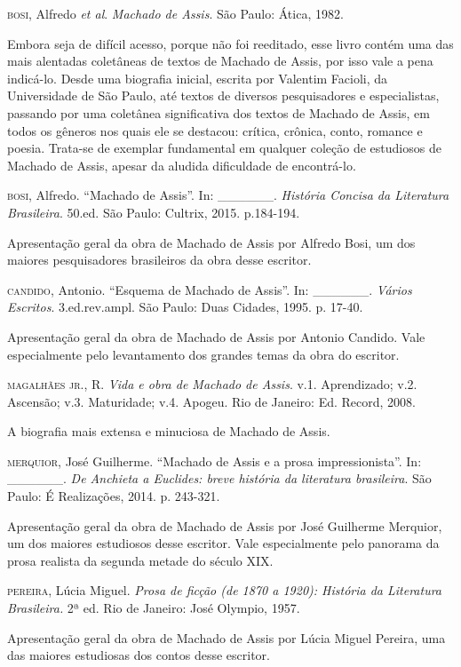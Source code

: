 \documentclass[11pt]{extarticle}
\begin{document}
\textsc{bosi}, Alfredo \emph{et al}. \textit{Machado de Assis}. São Paulo: Ática,
1982.

Embora seja de difícil acesso, porque não foi reeditado, esse livro
contém uma das mais alentadas coletâneas de textos de Machado de Assis,
por isso vale a pena indicá-lo. Desde uma biografia inicial, escrita por
Valentim Facioli, da Universidade de São Paulo, até textos de diversos
pesquisadores e especialistas, passando por uma coletânea significativa
dos textos de Machado de Assis, em todos os gêneros nos quais ele se
destacou: crítica, crônica, conto, romance e poesia. Trata-se de
exemplar fundamental em qualquer coleção de estudiosos de Machado de
Assis, apesar da aludida dificuldade de encontrá-lo.

\textsc{bosi}, Alfredo. ``Machado de Assis''. In: \_\_\_\_\_\_. \textit{História
Concisa da Literatura Brasileira}. 50.ed. São Paulo: Cultrix, 2015.
p.184-194.

Apresentação geral da obra de Machado de Assis por Alfredo Bosi, um dos
maiores pesquisadores brasileiros da obra desse escritor.

\textsc{candido}, Antonio. ``Esquema de Machado de Assis''. In: \_\_\_\_\_\_.
\textit{Vários Escritos}. 3.ed.rev.ampl. São Paulo: Duas Cidades, 1995.
p. 17-40.

Apresentação geral da obra de Machado de Assis por Antonio Candido. Vale
especialmente pelo levantamento dos grandes temas da obra do escritor.

\textsc{magalhães jr}., R. \textit{Vida e obra de Machado de Assis}. v.1.
Aprendizado; v.2. Ascensão; v.3. Maturidade; v.4. Apogeu. Rio de
Janeiro: Ed. Record, 2008.

A biografia mais extensa e minuciosa de Machado de Assis.

\textsc{merquior}, José Guilherme. ``Machado de Assis e a prosa impressionista''.
In: \_\_\_\_\_\_. \textit{De Anchieta a Euclides: breve história da
literatura brasileira}. São Paulo: É Realizações, 2014. p. 243-321.

Apresentação geral da obra de Machado de Assis por José Guilherme
Merquior, um dos maiores estudiosos desse escritor. Vale especialmente
pelo panorama da prosa realista da segunda metade do século XIX.

\textsc{pereira}, Lúcia Miguel. \textit{Prosa de ficção (de 1870 a 1920):
História da Literatura Brasileira.} 2ª ed. Rio de Janeiro: José Olympio,
1957.

Apresentação geral da obra de Machado de Assis por Lúcia Miguel Pereira,
uma das maiores estudiosas dos contos desse escritor.
\end{document}
